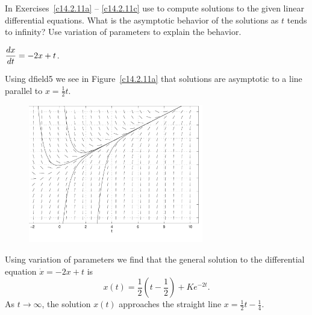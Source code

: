 \documentclass{ximera}
\begin{document}
\noindent In Exercises~\ref{c14.2.11a} -- \ref{c14.2.11c} use 
{\dfield} 
to compute solutions to the given linear differential equations.  What is 
the asymptotic behavior of the solutions as $t$ tends to infinity?  Use 
variation of parameters to explain the behavior.
\begin{computerExercise}   \label{c14.2.11a}
$\displaystyle\frac{dx}{dt} = -2 x + t$.

\begin{solution}
Using {\sf dfield5} we see in Figure~\ref{c14.2.11a} that
solutions are asymptotic to a line parallel to $x=\frac{1}{2}t$.

\begin{figure}[htb]
     \centerline{%
     \includegraphics[width=3.0in]{exfigure/fig17-1-11.pdf}}
\end{figure} 
Using variation of parameters we find that the general solution to the
differential equation $\dot{x}=-2x+t$ is 
\[
x(t) = \frac{1}{2}\left(t-\frac{1}{2}\right) +Ke^{-2t}.
\]
As $t\to\infty$, the solution $x(t)$ approaches the straight line 
$x= \frac{1}{2}t-\frac{1}{4}$.

\end{solution}
\end{computerExercise}
\end{document}
